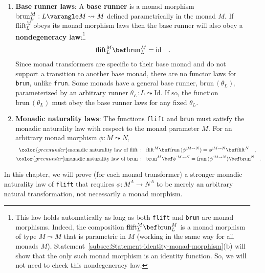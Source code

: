 \begin{enumerate}
\[\]
for any monad morphism $\phi:M\leadsto\text{Id}$, because the left-hand
side equals $\text{frun}\,(\text{pu}_{M}\bef\phi)$, and the composition
law for monad morphisms gives $\text{pu}_{M}\bef\phi=\text{pu}_{\text{Id}}=\text{id}$.
\item \textbf{Base runner laws}:
A \textbf{base runner} is a monad morphism $\text{brun}_{L}^{M}:L\varangle M\leadsto M$
defined parametrically in the monad $M$. If $\text{flift}_{L}^{M}$
obeys its monad morphism laws then the base runner will also obey
a \textbf{nondegeneracy law}:\footnote{This law holds automatically as long as both \lstinline!flift! and
\lstinline!brun! are monad morphisms. Indeed, the composition $\text{flift}_{L}^{M}\bef\text{brun}_{L}^{M}$
is a monad morphism of type $M\leadsto M$ that is parametric in $M$
(working in the same way for all monads $M$). Statement~\ref{subsec:Statement-identity-monad-morphism}(b)
will show that the only such monad morphism is an identity function.
So, we will not need to check this nondegeneracy law.}
\[
\text{flift}_{L}^{M}\bef\text{brun}_{L}^{M}=\text{id}\quad.
\]
Since monad transformers are specific to their base monad and do not
support a transition to another base monad, there are no functor laws
for \lstinline!brun!, unlike \lstinline!frun!. Some monads have
a general base runner, $\text{brun}\,(\theta_{L})$, parameterized
by an arbitrary runner $\theta_{L}:L\leadsto\text{Id}$. If so, the
function $\text{brun}\,(\theta_{L})$ must obey the base runner laws
for any fixed $\theta_{L}$.
\item \textbf{Monadic naturality laws}: 
The functions \lstinline!flift! and \lstinline!brun! must satisfy
the monadic naturality law with respect to the monad parameter $M$.
For an arbitrary monad morphism $\phi:M\leadsto N$,
\begin{align*}
{\color{greenunder}\text{monadic naturality law of }\text{flift}:}\quad & \text{flift}^{M}\bef\text{frun}\,(\phi^{:M\leadsto N})=\phi^{:M\leadsto N}\bef\text{flift}^{N}\quad,\\
{\color{greenunder}\text{monadic naturality law of }\text{brun}:}\quad & \text{brun}^{M}\bef\phi^{:M\leadsto N}=\text{frun}\,(\phi^{:M\leadsto N})\bef\text{brun}^{N}\quad.
\end{align*}
\end{enumerate}
In this chapter, we will prove (for each monad transformer) a stronger
monadic naturality law of \lstinline!flift! that requires $\phi:M^{A}\rightarrow N^{A}$
to be merely an arbitrary natural transformation, not necessarily
a monad morphism.

